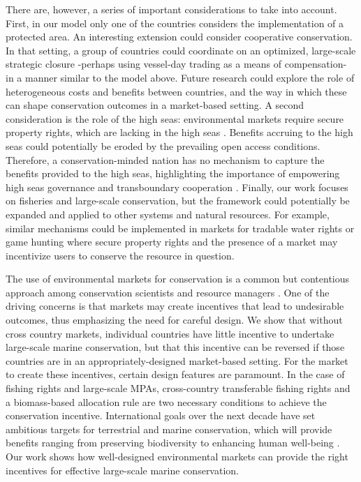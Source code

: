 \documentclass[12pt]{article}
\begin{document}
There are, however, a series of important considerations to take into account. First, in our model only one of the countries considers the implementation of a protected area. An interesting extension could consider cooperative conservation. In that setting, a group of countries could coordinate on an optimized, large-scale strategic closure -perhaps using vessel-day trading as a means of compensation- in a manner similar to the model above. Future research could explore the role of heterogeneous costs and benefits between countries, and the way in which these can shape conservation outcomes in a market-based setting. A second consideration is the role of the high seas: environmental markets require secure property rights, which are lacking in the high seas \cite{crespo_2019}. Benefits accruing to the high seas could potentially be eroded by the prevailing open access conditions. Therefore, a conservation-minded nation has no mechanism to capture the benefits provided to the high seas, highlighting the importance of empowering high seas governance and transboundary cooperation \cite{aqorau_2018,crespo_2019}. Finally, our work focuses on fisheries and large-scale conservation, but the framework could potentially be expanded and applied to other systems and natural resources. For example, similar mechanisms could be implemented in markets for tradable water rights \cite{rosegrant_1994} or game hunting \cite{hutton_2003} where secure property rights and the presence of a market may incentivize users to conserve the resource in question.

The use of environmental markets for conservation is a common but contentious approach among conservation scientists and resource managers \cite{sandbrook_2019}. One of the driving concerns is that markets may create incentives that lead to undesirable outcomes, thus emphasizing the need for careful design. We show that without cross country markets, individual countries have little incentive to undertake large-scale marine conservation, but that this incentive can be reversed if those countries are in an appropriately-designed market-based setting. For the market to create these incentives, certain design features are paramount. In the case of fishing rights and large-scale MPAs, cross-country transferable fishing rights and a biomass-based allocation rule are two necessary conditions to achieve the conservation incentive. International goals over the next decade have set ambitious targets for terrestrial and marine conservation, which will provide benefits ranging from preserving biodiversity to enhancing human well-being \cite{oleary_2016,dinerstein_2019,roberts_2017,ban_2019}. Our work shows how well-designed environmental markets can provide the right incentives for effective large-scale marine conservation.
\end{document}
